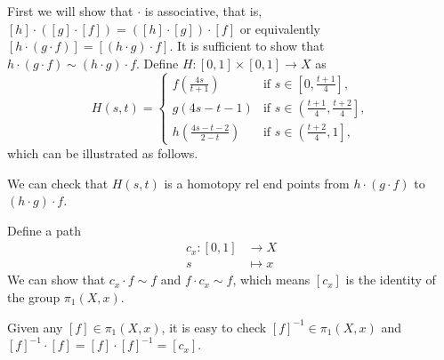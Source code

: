 \documentclass{report}
\begin{document}
\begin{prf}
	First we will show that $\cdot$ is associative, that is, $[h]\cdot\left([g]\cdot[f]\right)=\left([h]\cdot[g]\right)\cdot[f]$ or equivalently $[h\cdot(g\cdot f)]=[(h\cdot g)\cdot f]$. It is sufficient to show that $h\cdot(g\cdot f)\sim (h\cdot g)\cdot f$. Define $H:[0,1]\times[0,1]\to X$ as
	\[
		H(s,t)=\begin{cases}
			f\left(\frac{4s}{t+1}\right)     & \text{if }s\in\left[0,\frac{t+1}{4}\right],                          \\
			g(4s-t-1)                        & \text{if }s\in\left(\left.\frac{t+1}{4},\frac{t+2}{4}\right]\right., \\
			h\left(\frac{4s-t-2}{2-t}\right) & \text{if }s\in\left(\left.\frac{t+2}{4},1\right]\right.,
		\end{cases}
	\]
	which can be illustrated as follows.
	\begin{center}
	\end{center}
	We can check that $H(s,t)$ is a homotopy rel end points from $h\cdot(g\cdot f)$ to $(h\cdot g)\cdot f$.

	Define a path
	\begin{align*}
		c_x:[0,1] & \longrightarrow X \\
		s         & \longmapsto x
	\end{align*}
	We can show that $c_x\cdot f\sim f$ and $f\cdot c_x\sim f$, which means $[c_x]$ is the identity of the group $\pi_1(X,x)$.

	Given any $[f]\in \pi_1(X,x)$, it is easy to check $\left[f\right]^{-1}\in \pi_1(X,x)$ and $[f]^{-1}\cdot[f]=[f]\cdot[f]^{-1}=[c_x]$.
\end{prf}
\end{document}
